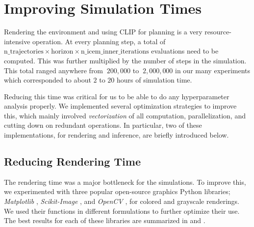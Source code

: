 \chapter{Improving Simulation Times}
\label{sec:efficiency}
Rendering the environment and using CLIP for planning is a very resource-intensive operation.
At every planning step, a total of \(\text{n\_trajectories} \times \text{horizon} \times \text{n\_icem\_inner\_iterations}\) evaluations need to be computed.
This was further multiplied by the number of steps in the simulation.
This total ranged anywhere from \(~200,000\) to \(~2,000,000\) in our many experiments which corresponded to about \(2\) to \(20\) hours of simulation time.

Reducing this time was critical for us to be able to do any hyperparameter analysis properly.
We implemented several optimization strategies to improve this, which mainly involved \emph{vectorization} of all computation, parallelization, and cutting down on redundant operations.
In particular, two of these implementations, for rendering and inference, are briefly introduced below.

\section{Reducing Rendering Time}
\label{sec:improving-render}
The rendering time was a major bottleneck for the simulations.
To improve this, we experimented with three popular open-source graphics Python libraries; \emph{Matplotlib} \citep{matplotlib}, \emph{Scikit-Image} \citep{skimage}, and \emph{OpenCV} \citep{opencv}, for colored and grayscale renderings.
We used their functions in different formulations to further optimize their use.
The best results for each of these libraries are summarized in  and .\\

